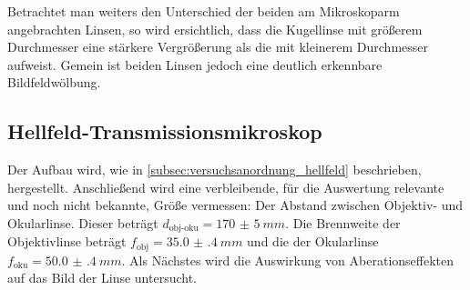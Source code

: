 \documentclass[english, ngerman]{scrartcl}
\begin{document}
\setcaphanging
%
Betrachtet man weiters den Unterschied der beiden am Mikroskoparm angebrachten Linsen, so wird ersichtlich, dass die Kugellinse mit größerem Durchmesser eine stärkere Vergrößerung als die mit kleinerem Durchmesser aufweist. Gemein ist beiden Linsen jedoch eine deutlich erkennbare Bildfeldwölbung.


\subsection{Hellfeld-Transmissionsmikroskop}
\label{subsec:durchfuehrung_hellfeld}

Der Aufbau wird, wie in \autoref{subsec:versuchsanordnung_hellfeld} beschrieben, hergestellt.
Anschließend wird eine verbleibende, für die Auswertung relevante und noch nicht bekannte, Größe vermessen: Der Abstand zwischen Objektiv- und Okularlinse. Dieser beträgt $d_{\text{obj-oku}}=\SI{170(5)}{mm}$. Die Brennweite der Objektivlinse beträgt $f_{\text{obj}}=\SI{35.0(4)}{mm}$ und die der Okularlinse $f_{\text{oku}}=\SI{50.0(4)}{mm}$.
Als Nächstes wird die Auswirkung von Aberationseffekten auf das Bild der Linse untersucht.
\end{document}
